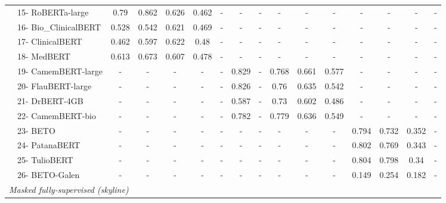 {\begin{tabular}{ll|ccccc|ccccc|cccc}
 & 15- RoBERTa-large & 0.79 & 0.862 & 0.626 & 0.462 & - & - & - & - & - & - & - & - & - & - \\
 & 16- Bio\_ClinicalBERT & 0.528 & 0.542 & 0.621 & 0.469 & - & - & - & - & - & - & - & - & - & - \\
 & 17- ClinicalBERT & 0.462 & 0.597 & 0.622 & 0.48 & - & - & - & - & - & - & - & - & - & - \\
 & 18- MedBERT & 0.613 & 0.673 & 0.607 & 0.478 & - & - & - & - & - & - & - & - & - & - \\
 & 19- CamemBERT-large & - & - & - & - & - & 0.829 & - & 0.768 & 0.661 & 0.577 & - & - & - & - \\
 & 20- FlauBERT-large & - & - & - & - & - & 0.826 & - & 0.76 & 0.635 & 0.542 & - & - & - & - \\
 & 21- DrBERT-4GB & - & - & - & - & - & 0.587 & - & 0.73 & 0.602 & 0.486 & - & - & - & - \\
 & 22- CamemBERT-bio & - & - & - & - & - & 0.782 & - & 0.779 & 0.636 & 0.549 & - & - & - & - \\
 & 23- BETO & - & - & - & - & - & - & - & - & - & - & 0.794 & 0.732 & 0.352 & - \\
 & 24- PatanaBERT & - & - & - & - & - & - & - & - & - & - & 0.802 & 0.769 & 0.343 & - \\
 & 25- TulioBERT & - & - & - & - & - & - & - & - & - & - & 0.804 & 0.798 & 0.34 & - \\
 & 26- BETO-Galen & - & - & - & - & - & - & - & - & - & - & 0.149 & 0.254 & 0.182 & - \\
\midrule
\midrule
\multicolumn{16}{l}{\textit{Masked fully-supervised (skyline)}} \\
\midrule
\bottomrule
\end{tabular}}